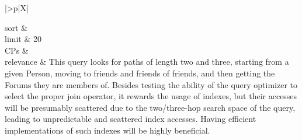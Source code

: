 \begin{tabularx}{\queryCardWidth}{|>{\queryPropertyCell}p{\queryPropertyCellWidth}|X|}
%
	
		sort		&
		\innerCardVSpace \\ \hline
	limit & 20 \\ \hline
	CPs &
	 \\ \hline
	relevance &
		\small This query looks for paths of length two and three, starting from a given Person, moving to friends and friends of
friends, and then getting the Forums they are members of. Besides testing the ability of the query optimizer to select
the proper join operator, it rewards the usage of indexes, but their accesses will be presumably scattered due to the
two/three-hop search space of the query, leading to unpredictable and scattered index accesses. Having efficient
implementations of such indexes will be highly beneficial.
 \\ \hline%
\end{tabularx}
\queryCardVSpace

\renewcommand{\emph}[1]{\oldemph{#1}}